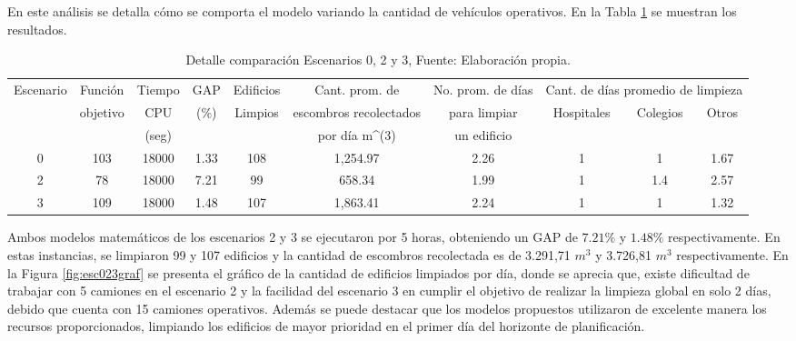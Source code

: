 \documentclass[12pt,a4paper]{article}
\begin{document}
En este análisis se detalla cómo se comporta el modelo variando la cantidad de vehículos operativos. En la Tabla \ref{tab:comp02} se muestran los resultados.
\begin{table}[h!]
\resizebox{15cm}{!} {
\begin{tabular}{c|c|c|c|c|c|c|c|c|c}
\hline
\multirow{3}{*}{Escenario} & Función                   & Tiempo & GAP                   & Edificios                & Cant. prom. de                 & No. prom. de días & \multicolumn{3}{c|}{Cant. de días promedio de limpieza}                          \\ \cline{8-10} 
                           & \multirow{2}{*}{objetivo} & CPU    & \multirow{2}{*}{(\%)} & \multirow{2}{*}{Limpios} & escombros recolectados         & para limpiar      & \multirow{2}{*}{Hospitales} & \multirow{2}{*}{Colegios} & \multirow{2}{*}{Otros} \\
                           &                           & (seg)  &                       &                          & por día m\textasciicircum{}(3) & un edificio       &                             &                           &                        \\ \hline
0                          & 103                       & 18000  & 1.33                  & 108                      & 1,254.97                       & 2.26              & 1                           & 1                         & 1.67                   \\ 
2                          & 78                        & 18000  & 7.21                  & 99                       & 658.34                         & 1.99              &  1                       & 1.4                          & 2.57                   \\
3                          & 109                       & 18000  & 1.48                  & 107                      & 1,863.41                       & 2.24              & 1                           & 1                         & 1.32                   \\ \hline
\end{tabular}
}
\caption{Detalle comparación Escenarios 0, 2 y 3, Fuente: Elaboración propia. }
\label{tab:comp02}
\end{table}


Ambos modelos matemáticos de los escenarios 2 y 3 se ejecutaron por 5 horas, obteniendo un GAP de $7.21\%$ y $1.48\%$ respectivamente. En estas instancias, se limpiaron 99 y 107 edificios y  la cantidad de escombros recolectada es de  3.291,71 $m^{3}$  y  3.726,81 $m^{3}$ respectivamente.
En la Figura \ref{fig:esc023graf} se presenta el gráfico de la cantidad de edificios limpiados por día, donde se aprecia que, existe dificultad de trabajar con 5 camiones en el escenario 2 y la facilidad del escenario 3 en cumplir el objetivo de realizar la limpieza global en solo 2 días, debido que cuenta con 15 camiones operativos. Además se puede destacar que los modelos propuestos utilizaron de excelente manera los recursos proporcionados, limpiando los edificios de mayor prioridad en el primer día del horizonte de  planificación.
\end{document}
